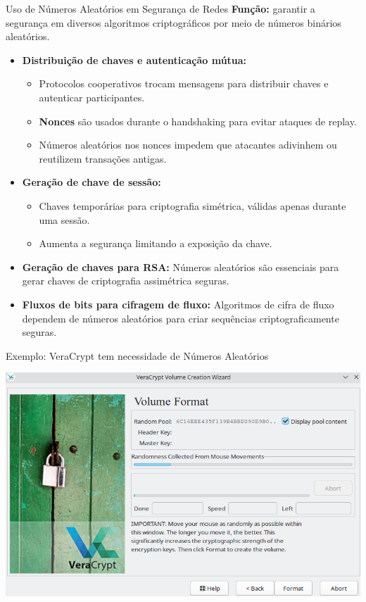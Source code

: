 \begin{frame}{Uso de Números Aleatórios em Segurança de Redes}
    \textbf{Função:} garantir a segurança em diversos algoritmos criptográficos por meio de números binários aleatórios.

    \medskip
    \begin{itemize}
        \item \textbf{Distribuição de chaves e autenticação mútua:}
              \begin{itemize}
                  \item Protocolos cooperativos trocam mensagens para distribuir chaves e autenticar participantes.
                  \item \textbf{Nonces} são usados durante o handshaking para evitar ataques de replay.
                  \item Números aleatórios nos nonces impedem que atacantes adivinhem ou reutilizem transações antigas.
              \end{itemize}

        \item \textbf{Geração de chave de sessão:}
              \begin{itemize}
                  \item Chaves temporárias para criptografia simétrica, válidas apenas durante uma sessão.
                  \item Aumenta a segurança limitando a exposição da chave.
              \end{itemize}

        \item \textbf{Geração de chaves para RSA:}
              Números aleatórios são essenciais para gerar chaves de criptografia assimétrica seguras.

        \item \textbf{Fluxos de bits para cifragem de fluxo:}
              Algoritmos de cifra de fluxo dependem de números aleatórios para criar sequências criptograficamente seguras.
    \end{itemize}
\end{frame}

\begin{frame}{Exemplo: VeraCrypt
        tem necessidade de Números Aleatórios}

    \centering
    \includegraphics[width=0.8\linewidth]{Figuras/veracrypt-randomness.png}


\end{frame}

